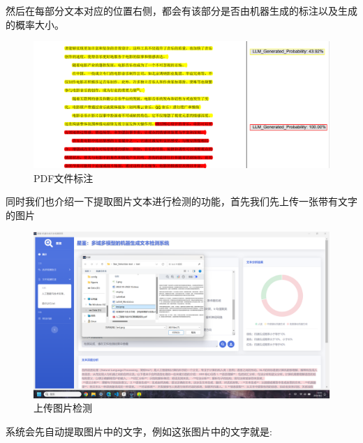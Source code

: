 \documentclass[a4paper]{report}
\begin{document}
然后在每部分文本对应的位置右侧，都会有该部分是否由机器生成的标注以及生成的概率大小。
\begin{figure}[H]
	\centering
	\includegraphics[width=\textwidth]{figures/PDF高亮结果.png}
	\caption{PDF文件标注}
	\label{PDF文件标注}
\end{figure}
同时我们也介绍一下提取图片文本进行检测的功能，首先我们先上传一张带有文字的图片
\begin{figure}[H]
	\centering
	\includegraphics[width=\textwidth]{figures/upload_picture.png}
	\caption{上传图片检测}
\end{figure}
系统会先自动提取图片中的文字，例如这张图片中的文字就是:
\end{document}
